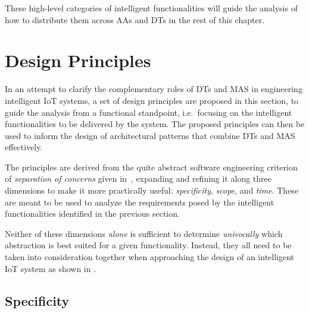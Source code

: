 \begin{description}
\end{description}

These high-level categories of intelligent functionalities will guide the analysis of how to distribute them across AAs and DTs in the rest of this chapter.

\section{Design Principles}

In an attempt to clarify the complementary roles of \acp{DT} and \ac{MAS} in engineering intelligent \ac{IoT} systems, a set of design principles are proposed in this section, to guide the analysis from a functional standpoint, i.e.\ focusing on the intelligent functionalities to be delivered by the system.
%
The proposed principles can then be used to inform the design of architectural patterns that combine \acp{DT} and \ac{MAS} effectively. 

The principles are derived from the quite abstract software engineering criterion of \emph{separation of concerns} given in~\cite{Mariani_Picone_Ricci_2022}, expanding and refining it along three dimensions to make it more practically useful: \emph{specificity}, \emph{scope}, and \emph{time}. 
%
These are meant to be used to analyze the requirements posed by the intelligent functionalities identified in the previous section. 

Neither of these dimensions \emph{alone} is sufficient to determine \emph{univocally} which abstraction is best suited for a given functionality. 
Instead, they all need to be taken into consideration together when approaching the design of an intelligent IoT system as shown in .


\subsection{Specificity} 

